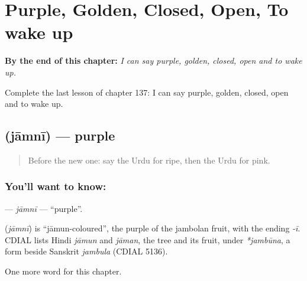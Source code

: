 
\chapter{Purple, Golden, Closed, Open, To wake up}
\label{ch:ur-purple-golden-closed-open-to-wake-up}

\begin{chapteropening}
\textbf{By the end of this chapter:} \emph{I can say purple, golden, closed, open and to wake up.}

Complete the last lesson of chapter 137: I can say purple, golden, closed, open and to wake up.
\end{chapteropening}

\section[\texorpdfstring{\ur{جامنی} (jāmnī)}{جامنی (jāmnī)}]{ (jāmnī) — purple}

\label{lesson:UR-C137-jamni}



\begin{quote}
Before the new one: say the Urdu for ripe, then the Urdu for pink.
\end{quote}

\subsection*{You'll want to know: }
\textbf{} — \emph{jāmnī} — \textquotedblleft{}purple\textquotedblright{}.

\begin{cousinweb}
\textbf{} (\emph{jāmnī}) is \textquotedblleft{}jāmun-coloured\textquotedblright{}, the purple of the jambolan fruit, with the ending \emph{-ī}. CDIAL lists Hindi \emph{jāmun} and \emph{jāman}, the tree and its fruit, under \emph{*jambūna}, a form beside Sanskrit \emph{jambula} (CDIAL 5136).
\end{cousinweb}

\begin{grammarlens}[title={What you've built}]
One more word for this chapter.
\end{grammarlens}

